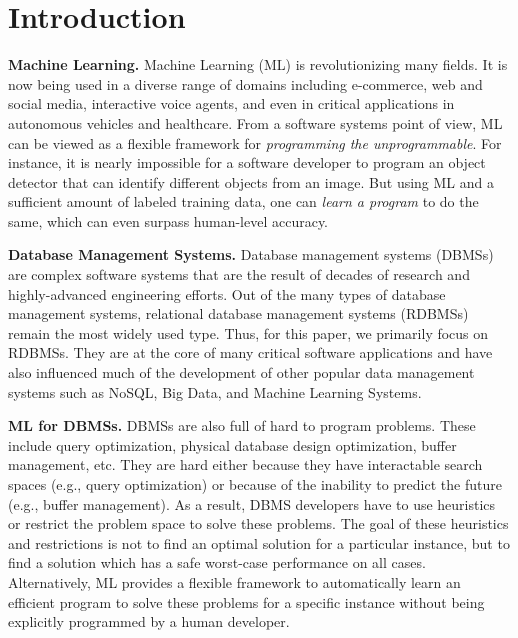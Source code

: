 \section{Introduction}

\vspace{2mm}
\noindent \textbf{Machine Learning.} Machine Learning (ML) is revolutionizing many fields.
It is now being used in a diverse range of domains including e-commerce, web and social media, interactive voice agents, and even in critical applications in autonomous vehicles and healthcare.
From a software systems point of view, ML can be viewed as a flexible framework for \textit{programming the unprogrammable}.
For instance, it is nearly impossible for a software developer to program an object detector that can identify different objects from an image.
But using ML and a sufficient amount of labeled training data, one can \textit{learn a program} to do the same, which can even surpass human-level accuracy.

\vspace{2mm}
\noindent \textbf{Database Management Systems.} Database management systems (DBMSs) are complex software systems that are the result of decades of research and highly-advanced engineering efforts.
Out of the many types of database management systems, relational database management systems (RDBMSs) remain the most widely used type.
Thus, for this paper, we primarily focus on RDBMSs.
They are at the core of many critical software applications and have also influenced much of the development of other popular data management systems such as NoSQL, Big Data, and Machine Learning Systems.

\vspace{2mm}
\noindent \textbf{ML for DBMSs.} DBMSs are also full of hard to program problems.
These include query optimization, physical database design optimization, buffer management, etc.
They are hard either because they have interactable search spaces (e.g., query optimization) or because of the inability to predict the future (e.g., buffer management).
As a result, DBMS developers have to use heuristics or restrict the problem space to solve these problems.
The goal of these heuristics and restrictions is not to find an optimal solution for a particular instance, but to find a solution which has a safe worst-case performance on all cases.
Alternatively, ML provides a flexible framework to automatically learn an efficient program to solve these problems for a specific instance without being explicitly programmed by a human developer.

